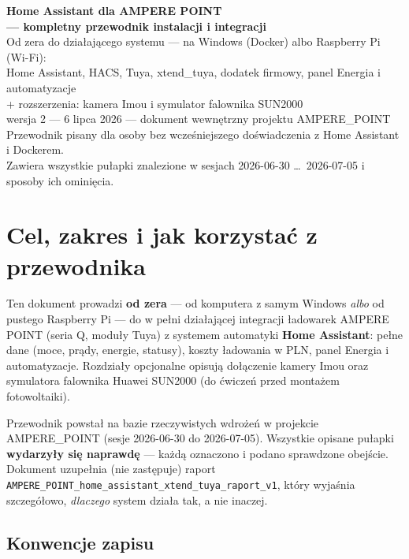 \documentclass[11pt,a4paper]{article}
\begin{document}
\begin{center}
{\huge\bfseries\sffamily\color{navy} Home Assistant dla AMPERE POINT\\[2pt] --- kompletny przewodnik instalacji i integracji}\\[8pt]
{\large Od zera do działającego systemu --- na Windows (Docker) albo Raspberry Pi (Wi-Fi):\\ Home Assistant, HACS, Tuya, xtend\_tuya, dodatek firmowy, panel Energia i automatyzacje\\[2pt] + rozszerzenia: kamera Imou i symulator falownika SUN2000}\\[6pt]
{\normalsize wersja 2 --- 6 lipca 2026 --- dokument wewnętrzny projektu AMPERE\_POINT}\\[2pt]
{\small Przewodnik pisany dla osoby bez wcześniejszego doświadczenia z Home Assistant i Dockerem.\\ Zawiera wszystkie pułapki znalezione w sesjach 2026-06-30 \ldots\ 2026-07-05 i sposoby ich ominięcia.}
\end{center}

\vspace{4pt}
\tableofcontents
\newpage

\section{Cel, zakres i jak korzystać z przewodnika}

Ten dokument prowadzi \textbf{od zera} --- od komputera z samym Windows \emph{albo} od pustego Raspberry Pi --- do w pełni działającej integracji ładowarek AMPERE POINT (seria Q, moduły Tuya) z systemem automatyki \textbf{Home Assistant}: pełne dane (moce, prądy, energie, statusy), koszty ładowania w PLN, panel Energia i automatyzacje. Rozdziały opcjonalne opisują dołączenie kamery Imou oraz symulatora falownika Huawei SUN2000 (do ćwiczeń przed montażem fotowoltaiki).

Przewodnik powstał na bazie rzeczywistych wdrożeń w projekcie AMPERE\_POINT (sesje 2026-06-30 do 2026-07-05). Wszystkie opisane pułapki \textbf{wydarzyły się naprawdę} --- każdą oznaczono i podano sprawdzone obejście. Dokument uzupełnia (nie zastępuje) raport \texttt{AMPERE\_POINT\_home\_assistant\_xtend\_tuya\_raport\_v1}, który wyjaśnia szczegółowo, \emph{dlaczego} system działa tak, a nie inaczej.

\subsection{Konwencje zapisu}
\end{document}
